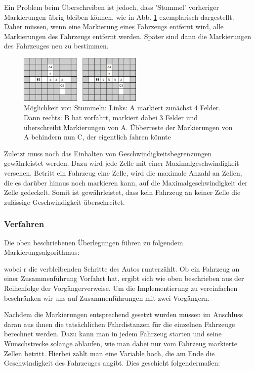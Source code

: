 \documentclass[10pt, a4paper]{article}
\begin{document}
Ein Problem beim Überschreiben ist jedoch, dass 'Stummel' vorheriger Markierungen übrig bleiben können, wie in Abb. \ref{fig:overwritingCanCauseStubs} exemplarisch dargestellt. Daher müssen, wenn eine Markierung eines Fahrzeugs entfernt wird, alle Markierungen des Fahrzeugs entfernt werden. Später sind dann die Markierungen des Fahrzeuges neu zu bestimmen.
\begin{figure}[h!]
	\centering
	\includegraphics[width=6cm]{img/stubs}
	\caption{Möglichkeit von Stummeln: Links: A markiert zunächst 4 Felder. Dann rechts: B hat vorfahrt, markiert dabei 3 Felder und überschreibt Markierungen von A. Übberreste der Markierungen von A behindern nun C, der eigentlich fahren könnte}
	\label{fig:overwritingCanCauseStubs}
\end{figure}

Zuletzt muss noch das Einhalten von Geschwindigkeitsbegrenzungen gewährleistet werden. Dazu wird jede Zelle mit einer Maximalgeschwindigkeit versehen. Betritt ein Fahrzeug eine Zelle, wird die maximale Anzahl an Zellen, die es darüber hinaus noch markieren kann, auf die Maximalgeschwindigkeit der Zelle gedeckelt. Somit ist gewährleistet, dass kein Fahrzeug an keiner Zelle die zulässige Geschwindigkeit überschreitet.

\subsubsection{Verfahren}
\label{subsubsec:kreisverkehrUmsetzungVerfahren}

Die oben beschriebenen Überlegungen führen zu folgendem Markierungsalgorithmus:

wobei r die verbleibenden Schritte des Autos runterzählt. Ob ein Fahrzeug an einer Zusammenführung Vorfahrt hat, ergibt sich wie oben beschrieben aus der Reihenfolge der Vorgängerverweise. Um die Implementierung zu vereinfachen beschränken wir uns auf Zusammenführungen mit zwei Vorgängern.

Nachdem die Markierungen entsprechend gesetzt wurden müssen im Anschluss daran aus ihnen die tatsächlichen Fahrdistanzen für die einzelnen Fahrzeuge berechnet werden. Dazu kann man in jedem Fahrzeug starten und seine Wunschstrecke solange ablaufen, wie man dabei nur vom Fahrzeug markierte Zellen betritt. Hierbei zählt man eine Variable hoch, die am Ende die Geschwindigkeit des Fahrzeuges angibt. Dies geschieht folgendermaßen:\\
\end{document}

